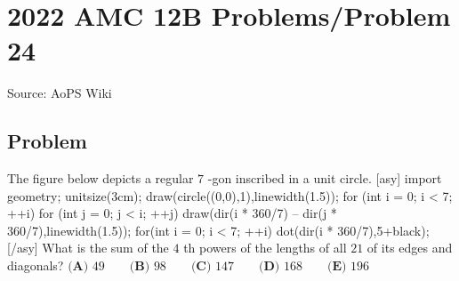 \documentclass[12pt]{article}
\begin{document}
\section*{{2022 AMC 12B Problems/Problem 24}}
Source: AoPS Wiki

\subsection*{Problem}
The figure below depicts a regular $7$ -gon inscribed in a unit circle. [asy] import geometry; unitsize(3cm); draw(circle((0,0),1),linewidth(1.5)); for (int i = 0; i < 7; ++i) { for (int j = 0; j < i; ++j) { draw(dir(i * 360/7) -- dir(j * 360/7),linewidth(1.5)); } } for(int i = 0; i < 7; ++i) { dot(dir(i * 360/7),5+black); } [/asy] What is the sum of the $4$ th powers of the lengths of all $21$ of its edges and diagonals? $\textbf{(A) }49 \qquad \textbf{(B) }98 \qquad \textbf{(C) }147 \qquad \textbf{(D) }168 \qquad \textbf{(E) }196$
\end{document}
